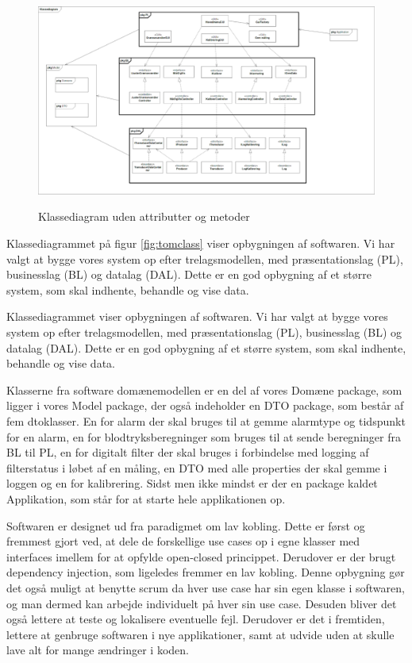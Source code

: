 \begin{figure}[h!]
	\centering
	\includegraphics[width=1\linewidth]{Arkitektur_og_design/Softwarearkitektur/tomclass}
	\label{fig:tomclass}
	\caption{Klassediagram uden attributter og metoder}
\end{figure}

Klassediagrammet på figur \vref{fig:tomclass} viser opbygningen af softwaren. Vi har valgt at bygge vores system op efter trelagsmodellen, med præsentationslag (PL), businesslag (BL) og datalag (DAL). Dette er en god opbygning af et større system, som skal indhente, behandle og vise data.

Klassediagrammet viser opbygningen af softwaren. Vi har valgt at bygge vores system op efter trelagsmodellen, med præsentationslag (PL), businesslag (BL) og datalag (DAL). Dette er en god opbygning af et større system, som skal indhente, behandle og vise data. 

Klasserne fra software domænemodellen er en del af vores Domæne package, som ligger i vores Model package, der også indeholder en DTO package, som består af fem dtoklasser. En for alarm der skal bruges til at gemme alarmtype og tidspunkt for en alarm, en for blodtryksberegninger som bruges til at sende beregninger fra BL til PL, en for digitalt filter der skal bruges i forbindelse med logging af filterstatus i løbet af en måling, en DTO med alle properties der skal gemme i loggen og en for kalibrering. Sidst men ikke mindst er der en package kaldet Applikation, som står for at starte hele applikationen op. 

Softwaren er designet ud fra paradigmet om lav kobling. Dette er først og fremmest gjort ved, at dele de forskellige use cases op i egne klasser med interfaces imellem for at opfylde open-closed princippet. Derudover er der brugt dependency injection, som ligeledes fremmer en lav kobling. Denne opbygning gør det også muligt at benytte scrum  da hver use case har sin egen klasse i softwaren, og man dermed kan arbejde individuelt på hver sin use case. Desuden bliver det også lettere at teste og lokalisere eventuelle fejl. Derudover er det i fremtiden, lettere at genbruge softwaren i nye applikationer, samt at udvide uden at skulle lave alt for mange ændringer i koden. 


